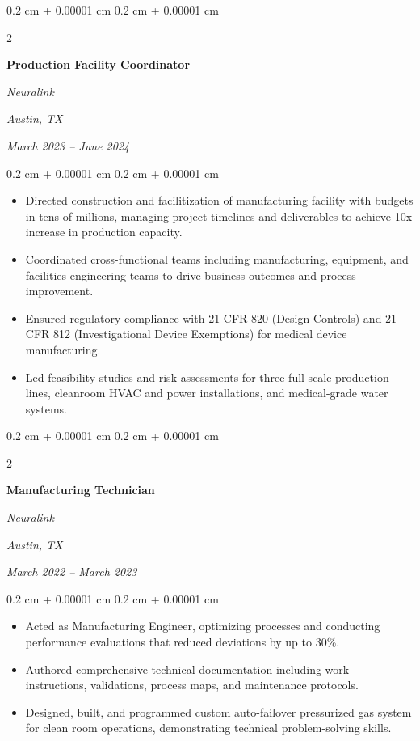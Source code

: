 \documentclass[10pt, letterpaper]{article}
\newenvironment{highlights}{
    \begin{itemize}[
        topsep=0.10 cm,
        parsep=0.10 cm,
        partopsep=0pt,
        itemsep=0pt,
        leftmargin=0.4 cm + 10pt
    ]
}{
    \end{itemize}
} %
\newenvironment{onecolentry}{
    \begin{adjustwidth}{
        0.2 cm + 0.00001 cm
    }{
        0.2 cm + 0.00001 cm
    }
}{
    \end{adjustwidth}
} %
\newenvironment{twocolentry}[2][]{
    \onecolentry
    \def\secondColumn{#2}
    \setcolumnwidth{\fill, 9.0 cm}
    \begin{paracol}{2}
}{
    \switchcolumn \raggedleft \secondColumn
    \end{paracol}
    \endonecolentry
} %
\begin{document}
        \vspace{0.35 cm}

        \begin{twocolentry}{
        \textit{Austin, TX}    
            
        \textit{March 2023 – June 2024}}
            \textbf{Production Facility Coordinator}
            
            \textit{Neuralink}
        \end{twocolentry}

        \vspace{0.10 cm}
        \begin{onecolentry}
            \begin{highlights}
                \item Directed construction and facilitization of manufacturing facility with budgets in tens of millions, managing project timelines and deliverables to achieve 10x increase in production capacity.
                \item Coordinated cross-functional teams including manufacturing, equipment, and facilities engineering teams to drive business outcomes and process improvement.
                \item Ensured regulatory compliance with 21 CFR 820 (Design Controls) and 21 CFR 812 (Investigational Device Exemptions) for medical device manufacturing.
                \item Led feasibility studies and risk assessments for three full-scale production lines, cleanroom HVAC and power installations, and medical-grade water systems.
            \end{highlights}
        \end{onecolentry}

        \vspace{0.35 cm}

        \begin{twocolentry}{
        \textit{Austin, TX}    
            
        \textit{March 2022 – March 2023}}
            \textbf{Manufacturing Technician}
            
            \textit{Neuralink}
        \end{twocolentry}

        \vspace{0.10 cm}
        \begin{onecolentry}
            \begin{highlights}
                \item Acted as Manufacturing Engineer, optimizing processes and conducting performance evaluations that reduced deviations by up to 30\%.
                \item Authored comprehensive technical documentation including work instructions, validations, process maps, and maintenance protocols.
                \item Designed, built, and programmed custom auto-failover pressurized gas system for clean room operations, demonstrating technical problem-solving skills.
            \end{highlights}
        \end{onecolentry}
\end{document}
